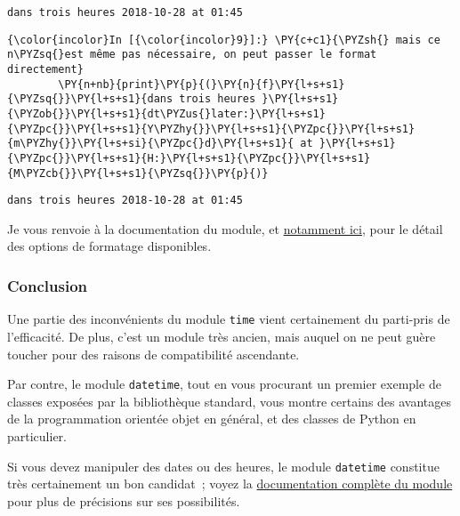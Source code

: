     \begin{Verbatim}[commandchars=\\\{\},frame=single,framerule=0.3mm,rulecolor=\color{cellframecolor}]
dans trois heures 2018-10-28 at 01:45
\end{Verbatim}

    \begin{Verbatim}[commandchars=\\\{\},frame=single,framerule=0.3mm,rulecolor=\color{cellframecolor}]
{\color{incolor}In [{\color{incolor}9}]:} \PY{c+c1}{\PYZsh{} mais ce n\PYZsq{}est même pas nécessaire, on peut passer le format directement}
        \PY{n+nb}{print}\PY{p}{(}\PY{n}{f}\PY{l+s+s1}{\PYZsq{}}\PY{l+s+s1}{dans trois heures }\PY{l+s+s1}{\PYZob{}}\PY{l+s+s1}{dt\PYZus{}later:}\PY{l+s+s1}{\PYZpc{}}\PY{l+s+s1}{Y\PYZhy{}}\PY{l+s+s1}{\PYZpc{}}\PY{l+s+s1}{m\PYZhy{}}\PY{l+s+si}{\PYZpc{}d}\PY{l+s+s1}{ at }\PY{l+s+s1}{\PYZpc{}}\PY{l+s+s1}{H:}\PY{l+s+s1}{\PYZpc{}}\PY{l+s+s1}{M\PYZcb{}}\PY{l+s+s1}{\PYZsq{}}\PY{p}{)}
\end{Verbatim}


    \begin{Verbatim}[commandchars=\\\{\},frame=single,framerule=0.3mm,rulecolor=\color{cellframecolor}]
dans trois heures 2018-10-28 at 01:45
\end{Verbatim}

    Je vous renvoie à la documentation du module, et
\href{https://docs.python.org/3/library/datetime.html\#strftime-and-strptime-behavior}{notamment
ici}, pour le détail des options de formatage disponibles.

    \hypertarget{conclusion}{%
\subsubsection{Conclusion}\label{conclusion}}

    Une partie des inconvénients du module \texttt{time} vient certainement
du parti-pris de l'efficacité. De plus, c'est un module très ancien,
mais auquel on ne peut guère toucher pour des raisons de compatibilité
ascendante.

Par contre, le module \texttt{datetime}, tout en vous procurant un
premier exemple de classes exposées par la bibliothèque standard, vous
montre certains des avantages de la programmation orientée objet en
général, et des classes de Python en particulier.

Si vous devez manipuler des dates ou des heures, le module
\texttt{datetime} constitue très certainement un bon candidat~; voyez la
\href{https://docs.python.org/3/library/datetime.html}{documentation
complète du module} pour plus de précisions sur ses possibilités.

